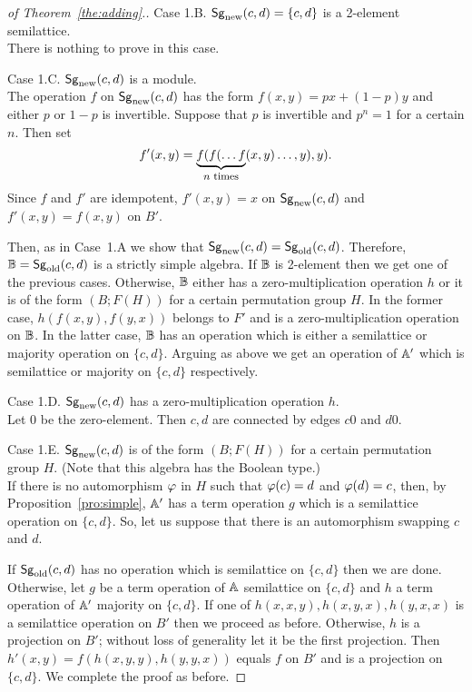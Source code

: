 \documentclass[11pt]{article}
\begin{document}
\begin{proof}[of Theorem~\ref{the:adding}.]
\noindent
{\sc Case 1.B.} ${\sf Sg}_{\mathrm{new}}(c,d)=\{c,d\}$ is a 2-element
semilattice.\\[2mm] 
There is nothing to prove in this case.
\medskip

\noindent
{\sc Case 1.C.} ${\sf Sg}_{\mathrm{new}}(c,d)$ is a module.\\[2mm] 
The operation $f$ on ${\sf Sg}_{\mathrm{new}}(c,d)$ has the form $f(x,y)=px+(1-p)y$
and either $p$ or $1-p$ is invertible. Suppose that $p$ is invertible
and $p^n=1$ for a certain $n$. Then set 
$$
f'(x,y)=\underbrace{f(f(\ldots f}_{\mbox{\footnotesize $n$ times}}(x,y) 
\ldots,y),y).
$$
Since $f$ and $f'$ are idempotent, $f'(x,y)=x$ on ${\sf Sg}_{\mathrm{new}}(c,d)$ and
$f'(x,y)=f(x,y)$ on $B'$. 

Then, as in Case~1.A we show that
${\sf Sg}_{\mathrm{new}}(c,d)={\sf Sg}_{\mathrm{old}}(c,d)$. Therefore, ${\mathbb B}={\sf Sg}_{\mathrm{old}}(c,d)$ is a
strictly simple algebra. If ${\mathbb B}$ is 2-element then we get one of the
previous cases. Otherwise, ${\mathbb B}$ either has a zero-multiplication
operation $h$ or it is of the form $(B;F(H))$ for a certain
permutation group $H$. In the former case, $h(f(x,y),f(y,x))$ belongs
to $F'$ and is a zero-multiplication operation on ${\mathbb B}$. In the latter 
case, ${\mathbb B}$ has an operation which is either a semilattice or majority 
operation on $\{c,d\}$. Arguing as above we get an operation of
${\mathbb A}'$ which is semilattice or majority on $\{c,d\}$ respectively.
\medskip

\noindent
{\sc Case 1.D.} ${\sf Sg}_{\mathrm{new}}(c,d)$ has a zero-multiplication
operation $h$.\\[2mm] 
Let $0$ be the zero-element. Then $c,d$ are connected by edges $c0$
and $d0$.
\medskip

\noindent
{\sc Case 1.E.} ${\sf Sg}_{\mathrm{new}}(c,d)$ is of the form $(B;F(H))$ for a
certain permutation group $H$. (Note that this algebra has the Boolean type.)\\[2mm] 
If there is no automorphism $\varphi$ in $H$ such that $\varphi(c)=d$ and
$\varphi(d)=c$, then, by Proposition~\ref{pro:simple}, ${\mathbb A}'$ has a term
operation $g$ which is a semilattice operation on $\{c,d\}$. So, let
us suppose that there is an automorphism swapping $c$ and $d$. 

If ${\sf Sg}_{\mathrm{old}}(c,d)$ has no
operation which is semilattice on $\{c,d\}$ then we are
done. Otherwise, let $g$ be a term operation of ${\mathbb A}$ semilattice on
$\{c,d\}$ and $h$ a term operation of ${\mathbb A}'$ majority on
$\{c,d\}$. If one of $h(x,x,y),h(x,y,x),h(y,x,x)$ is a semilattice
operation on $B'$ then we proceed as before. Otherwise, $h$ is a
projection on $B'$; without loss of generality let it be the first
projection. Then $h'(x,y)=f(h(x,y,y),h(y,y,x))$ equals $f$ on 
$B'$ and is a projection on $\{c,d\}$. We complete the proof as
before. 
\medskip


\end{proof}
\end{document}
